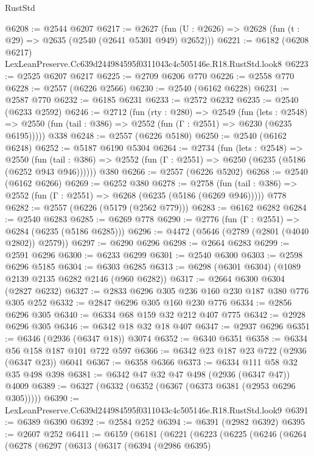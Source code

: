 \begin{lexlean}{RustStd}
\begin{coremodule}
@6208 := @2544 @6207
@6217 := @2627 (fun (U : @2626) => @2628 (fun (t : @29) => @2635 (@2540 (@2641 @5301 @949) @2652)))
@6221 := @6182 (@6208 @6217) LexLeanPreserve.Cc639d244984595f0311043c4c505146e.R18.RustStd.look8
@6223 := @2525 @6207 @6217
@6225 := @2709 @6206 @770
@6226 := @2558 @770
@6228 := @2557 (@6226 @2566)
@6230 := @2540 (@6162 @6228)
@6231 := @2587 @770
@6232 := @6185 @6231
@6233 := @2572 @6232
@6235 := @2540 (@6233 @2592)
@6246 := @2712
    (fun (rty : @280) =>
    @2549
      (fun (lets : @2548) =>
      @2550 (fun (tail : @386) => @2552 (fun (Γ : @2551) => @6230 (@6235 @6195)))))
    @338
@6248 := @2557 (@6226 @5180)
@6250 := @2540 (@6162 @6248)
@6252 := @5187 @6190 @5304
@6264 := @2734
    (fun (lets : @2548) =>
    @2550 (fun (tail : @386) => @2552 (fun (Γ : @2551) => @6250 (@6235 (@5186 (@6252 @943 @946))))))
    @380
@6266 := @2557 (@6226 @5202)
@6268 := @2540 (@6162 @6266)
@6269 := @6252 @380
@6278 := @2758
    (fun (tail : @386) => @2552 (fun (Γ : @2551) => @6268 (@6235 (@5186 (@6269 @946)))))
    @778
@6282 := @2557 (@6226 (@5179 (@2562 @779)))
@6283 := @6162 @6282
@6284 := @2540 @6283
@6285 := @6269 @778
@6290 := @2776 (fun (Γ : @2551) => @6284 (@6235 (@5186 @6285)))
@6296 := @4472 (@5646 (@2789 (@2801 (@4040 @2802)) @2579))
@6297 := @6290 @6296
@6298 := @2664 @6283
@6299 := @2591 @6296
@6300 := @6233 @6299
@6301 := @2540 @6300
@6303 := @2598 @6296 @5185
@6304 := @6303 @6285
@6313 := @6298 (@6301 @6304) (@1089 @2139 @2135 @6282 @2146 (@960 @6282))
@6317 := @2664 @6300 @6304 (@2827 @6232)
@6327 := @2833 @6296 @305 @236 @160 @230 @187 @380 @776 @305 @252
@6332 := @2847 @6296 @305 @160 @230 @776
@6334 := @2856 @6296 @305
@6340 := @6334 @68 @159 @32 @212 @407 @775
@6342 := @2928 @6296 @305
@6346 := @6342 @18 @32 @18 @407
@6347 := @2937 @6296
@6351 := @6346 (@2936 (@6347 @18)) @3074
@6352 := @6340 @6351
@6358 := @6334 @56 @158 @187 @101 @722 @597
@6366 := @6342 @23 @187 @23 @722 (@2936 (@6347 @23)) @6041
@6367 := @6358 @6366
@6373 := @6334 @111 @58 @32 @35 @498 @398
@6381 := @6342 @47 @32 @47 @498 (@2936 (@6347 @47)) @4009
@6389 := @6327 (@6332 (@6352 (@6367 (@6373 @6381 (@2953 @6296 @305)))))
@6390 := LexLeanPreserve.Cc639d244984595f0311043c4c505146e.R18.RustStd.look9
@6391 := @6389 @6390
@6392 := @2584 @252
@6394 := @6391 (@2982 @6392)
@6395 := @2607 @252
@6411 := @6159
    (@6181
      (@6221
        (@6223
          (@6225
            (@6246
              (@6264
                (@6278
                  (@6297
                    (@6313
                      (@6317
                        (@6394
                          (@2986 @6395)

\end{coremodule}
\end{lexlean}
